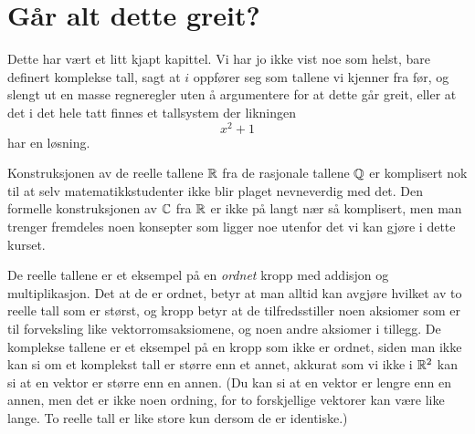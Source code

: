 \section*{Går alt dette greit?}
Dette har vært et litt kjapt kapittel. 
Vi har jo ikke vist noe som helst, bare definert komplekse tall, sagt at $i$ oppfører seg som tallene vi kjenner fra før, 
og slengt ut en masse regneregler uten å argumentere for at dette går greit, 
eller at det i det hele tatt finnes et tallsystem der likningen
\[
x^2+1
\]
har en løsning. 

Konstruksjonen av de reelle tallene $\mathbb{R}$ fra de rasjonale tallene $\mathbb{Q}$ er komplisert nok til at selv matematikkstudenter ikke blir plaget nevneverdig med det. 
Den formelle konstruksjonen av $\mathbb{C}$ fra $\mathbb{R}$ er ikke på langt nær så komplisert, 
men man trenger fremdeles noen konsepter som ligger noe utenfor det vi kan gjøre i dette kurset.

De reelle tallene er et eksempel på en \emph{ordnet} kropp med addisjon og multiplikasjon. 
Det at de er ordnet, betyr at man alltid kan avgjøre hvilket av to reelle tall som er størst, 
og kropp betyr at de tilfredsstiller noen aksiomer som er til forveksling like vektorromsaksiomene, 
og noen andre aksiomer i tillegg. 
De komplekse tallene er et eksempel på en kropp som ikke er ordnet, 
siden man ikke kan si om et komplekst tall er større enn et annet, 
akkurat som vi ikke i $\mathbb{R}^2$ kan si at en vektor er større enn en annen. 
(Du kan si at en vektor er lengre enn en annen, men det er ikke noen ordning, 
for to forskjellige vektorer kan være like lange. 
To reelle tall er like store kun dersom de er identiske.)


%
%
%
%
%
%
%
%
\kapittelslutt
